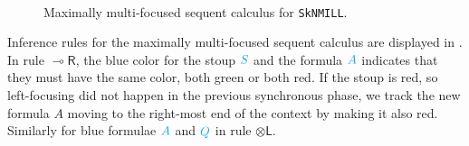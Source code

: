\documentclass[runningheads]{llncs}
\newcommand{\tl}{\otimes \mathsf{L}}
\newcommand{\tr}{\otimes \mathsf{R}}
\newcommand{\lright}{{\multimap}\mathsf{R}}
\newcommand{\lleft}{{\multimap}\mathsf{L}}
\newcommand{\pass}{\mathsf{pass}}
\newcommand{\unitr}{\mathsf{IR}}
\newcommand{\otL}{\tl}
\newcommand{\otR}{\tr}
\newcommand{\lolliR}{\lright}
\newcommand{\lolliL}{\lleft}
\newcommand{\IR}{\unitr}
\newcommand{\ot}{\otimes}
\newcommand{\lolli}{\multimap}
\newcommand{\I}{\mathsf{I}}
\newcommand{\SkNMILL}{\texttt{SkNMILL}}
\newcommand{\red}[1]{{\color{Red}#1}}
\newcommand{\blue}[1]{{\color{Cerulean}#1}}
\newcommand{\green}[1]{{\color{Green}#1}}
\newcommand{\up}{\Uparrow}
\newcommand{\dn}{\Downarrow}
\newcommand{\blurL}{\mathsf{blur_L}}
\newcommand{\blurR}{\mathsf{blur_R}}
\begin{document}
\begin{figure}[t]
\[\begin{array}{c}
    \end{array}
  \]
  \caption{Maximally multi-focused sequent calculus for \SkNMILL.} 
  \label{fig:max-multi-focus}
\end{figure}

Inference rules for the maximally multi-focused sequent calculus are displayed in . In rule $\lolliR$, the blue color for the stoup $\blue{S}$ and the formula $\blue{A}$ indicates that they must have the same color, both green or both red. If the stoup is red, so left-focusing did not happen in the previous synchronous phase, we track the new formula $A$ moving to the right-most end of the context by making it also red.
Similarly for blue formulae $\blue{A}$ and $\blue{Q}$ in rule $\otL$.
\end{document}

